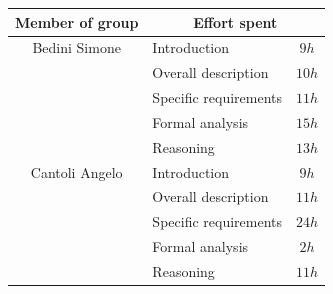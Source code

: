 \begin{table}[h!]
\centering
\renewcommand{\arraystretch}{1.5} %
\begin{tabular}{c|l|c}
    \hline
    Member of group & \multicolumn{2}{c}{Effort spent} \\
    \hline
    Bedini Simone & Introduction & $9h$ \\
                                & Overall description & $10h$ \\
                                & Specific requirements & $11h$ \\
                                & Formal analysis & $15h$ \\
                                & Reasoning & $13h$ \\
    \hline
    Cantoli Angelo & Introduction & $9h$ \\
                                & Overall description & $11h$ \\
                                & Specific requirements & $24h$ \\
                                & Formal analysis & $2h$ \\
                                & Reasoning & $11h$ \\
    \hline
\end{tabular}
\end{table}